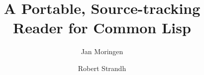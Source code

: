 \documentclass[format=sigconf]{acmart}
\begin{document}

\title{A Portable, Source-tracking Reader for Common Lisp
}

\author{Jan Moringen}


\author{Robert Strandh}




\end{document}
